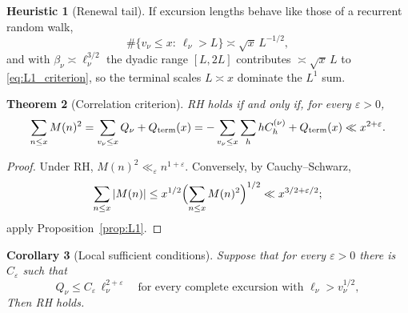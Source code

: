 \documentclass[11pt]{amsart}
\numberwithin{equation}{section}
\theoremstyle{plain}
\newtheorem{theorem}{Theorem}[section]
\newtheorem{corollary}[theorem]{Corollary}
\theoremstyle{definition}
\newtheorem{heuristic}[theorem]{Heuristic}
\theoremstyle{remark}
\newcommand{\eps}{\varepsilon}
\begin{document}
\begin{heuristic}[Renewal tail]
\label{heu:renewal}
If excursion lengths behave like those of a recurrent random walk,
\begin{equation}
\label{eq:renewal_tail}
  \#\{v_\nu\le x:\ \ell_\nu>L\}\asymp\sqrt{x}\,L^{-1/2},
\end{equation}
and with $\beta_\nu\asymp\ell_\nu^{3/2}$ the dyadic range $[L,2L]$
contributes $\asymp\sqrt{x}\,L$ to \eqref{eq:L1_criterion}, so the terminal
scales $L\asymp x$ dominate the $L^1$ sum.
\end{heuristic}

\begin{theorem}[Correlation criterion]
\label{thm:corr-criterion}
RH holds if and only if, for every $\eps>0$,
\begin{equation}
\label{eq:RH-corr}
  \sum_{n\le x}M(n)^2=\sum_{v_\nu\le x}Q_\nu+Q_{\rm term}(x)
  =-\sum_{v_\nu\le x}\sum_{h}hC^{(\nu)}_h+Q_{\rm term}(x)\ll x^{2+\eps}.
\end{equation}
\end{theorem}

\begin{proof}
Under RH, $M(n)^2\ll_\eps n^{1+\eps}$. Conversely, by Cauchy--Schwarz,
\[
\sum_{n\le x}|M(n)|\le x^{1/2}\Bigl(\sum_{n\le x}M(n)^2\Bigr)^{1/2}\ll x^{3/2+\eps/2};
\]
apply
Proposition~\ref{prop:L1}.
\end{proof}

\begin{corollary}[Local sufficient conditions]
\label{cor:local-corr-sufficient}
\label{cor:pruned_local}
Suppose that for every $\eps>0$ there is $C_\eps$ such that
\begin{equation}
\label{eq:pruned_Q}
  Q_\nu\le C_\eps\,\ell_\nu^{2+\eps}\quad\text{for every complete excursion with }
  \ell_\nu>v_\nu^{1/2},
\end{equation}
Then RH holds.
\end{corollary}
\end{document}
